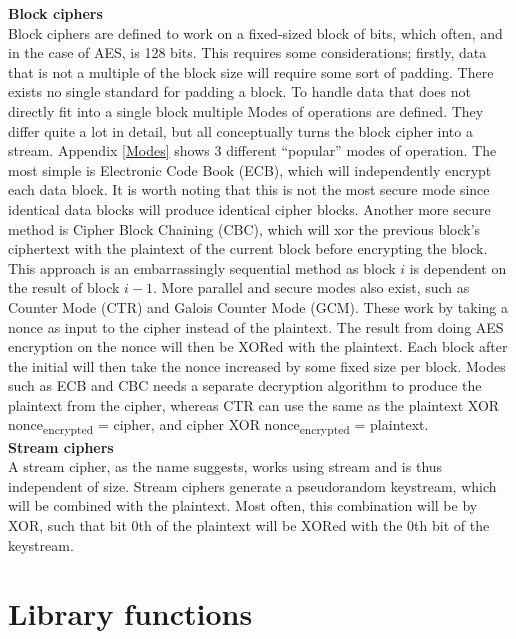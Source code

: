 \documentclass[a4paper, openany]{book}
\begin{document}
\begin{abstact}
\textbf{Block ciphers}\\
Block ciphers are defined to work on a fixed-sized block of bits, which often, and in the case of AES, is 128 bits. This requires some considerations; firstly, data that is not a multiple of the block size will require some sort of padding. There exists no single standard for padding a block. To handle data that does not directly fit into a single block multiple Modes of operations are defined. They differ quite a lot in detail, but all conceptually turns the block cipher into a stream. Appendix \ref{Modes} shows 3 different ``popular'' modes of operation. The most simple is Electronic Code Book (ECB), which will independently encrypt each data block. It is worth noting that this is not the most secure mode since identical data blocks will produce identical cipher blocks. Another more secure method is Cipher Block Chaining (CBC), which will xor the previous block's ciphertext with the plaintext of the current block before encrypting the block. This approach is an embarrassingly sequential method as block \(i\) is dependent on the result of block \(i-1\). More parallel and secure modes also exist, such as Counter Mode (CTR) and Galois Counter Mode (GCM). These work by taking a nonce as input to the cipher instead of the plaintext. The result from doing AES encryption on the nonce will then be XORed with the plaintext. Each block after the initial will then take the nonce increased by some fixed size per block. Modes such as ECB and CBC needs a separate decryption algorithm to produce the plaintext from the cipher, whereas CTR can use the same as the plaintext XOR nonce\textsubscript{encrypted} = cipher, and cipher XOR nonce\textsubscript{encrypted} = plaintext.\\

\textbf{Stream ciphers}\\
A stream cipher, as the name suggests, works using stream and is thus independent of size. Stream ciphers generate a pseudorandom keystream, which will be combined with the plaintext. Most often, this combination will be by XOR, such that bit 0th of the plaintext will be XORed with the 0th bit of the keystream.
\chapter{Library functions}
\label{sec:org13fa8d2}

\end{abstact}
\end{document}
